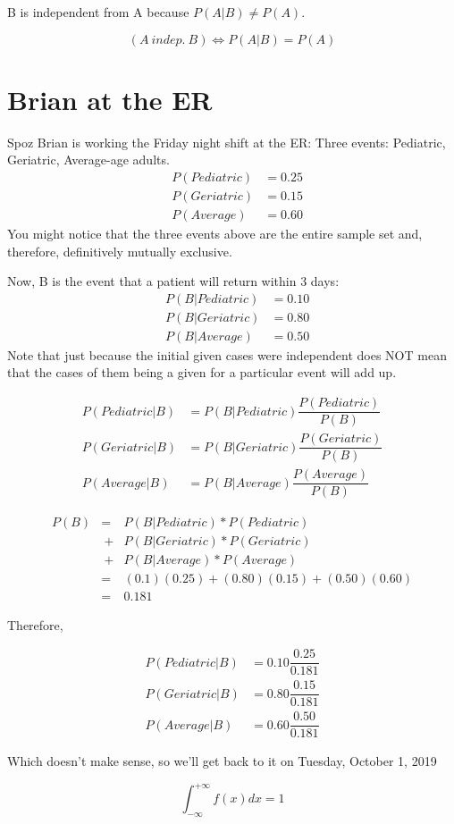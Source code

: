 \documentclass[]{article}
\begin{document}
	B is independent from A because $P(A|B)\neq P(A)$.
	
	\begin{equation}
	(A\ indep.\ B) \iff P(A|B) = P(A)
	\label{Formula of Independence}
	\end{equation}
	
	\section{Brian at the ER}
	
	Spoz Brian is working the Friday night shift at the ER: Three events: Pediatric, Geriatric, Average-age adults.
	\begin{align*}
	&P(Pediatric) &= 0.25 \\
	&P(Geriatric) &= 0.15 \\
	&P(Average)   &= 0.60
	\end{align*}
	You might notice that the three events above are the entire sample set and, therefore, definitively mutually exclusive.
	
	Now, B is the event that a patient will return within 3 days:
	\begin{align*}
	&P(B|Pediatric) &= 0.10\\
	&P(B|Geriatric) &= 0.80\\
	&P(B|Average)   &= 0.50
	\end{align*}
	Note that just because the initial given cases were independent does NOT mean that the cases of them being a given for a particular event will add up.
	
	\begin{align*}
	P(Pediatric|B) &= P(B|Pediatric)\dfrac{P(Pediatric)}{P(B)}\\
	P(Geriatric|B) &= P(B|Geriatric)\dfrac{P(Geriatric)}{P(B)}\\
	  P(Average|B) &= P(B|Average)\dfrac{P(Average)}{P(B)}
	\end{align*}
	
	\begin{align*}
	P(B) &=\ & P(B|Pediatric) * P(Pediatric)\\
	     &\ +& P(B|Geriatric) * P(Geriatric)\\
	     &\ +& P(B|Average) * P(Average)\\
	     &=\ & (0.1)(0.25) + (0.80)(0.15) + (0.50)(0.60)\\
	     &=\ & 0.181
	\end{align*}
	
	Therefore,
	
	\begin{align*}
	P(Pediatric|B) &= 0.10\dfrac{0.25}{0.181} \\
	P(Geriatric|B) &= 0.80\dfrac{0.15}{0.181} \\
	P(Average|B)   &= 0.60\dfrac{0.50}{0.181}
	\end{align*}
	
	Which doesn't make sense, so we'll get back to it on Tuesday, October 1, 2019
	
	$$\int_{-\infty}^{+\infty}f(x)dx = 1$$
	
\end{document}
